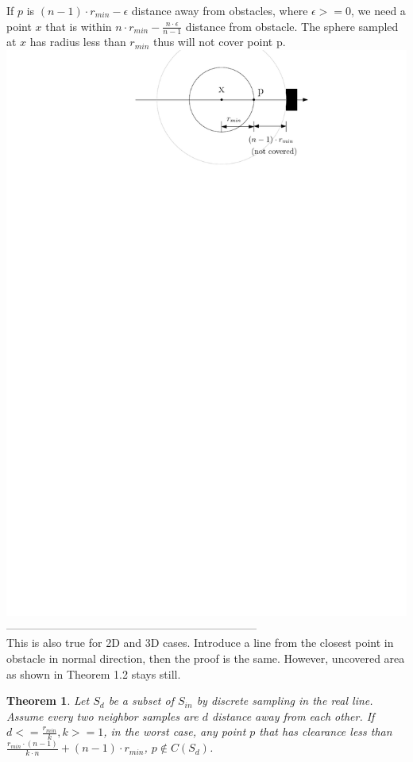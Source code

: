 \documentclass[12pt]{article}
\newtheorem{theorem}{Theorem}[section]
\begin{document}
  If $p$ is $(n-1) \cdot r_{min} - \epsilon$ distance away from obstacles, where $\epsilon >= 0$, we need a point $x$ that is within $n \cdot r_{min} - \frac{n \cdot \epsilon}{n-1}$ distance from obstacle.  The sphere sampled at $x$ has radius less than $r_{min}$ thus will not cover point p.\\
 
  \includegraphics[scale=0.8]{sample_1_3} \\
  
  --------------------------------------------------------------------\\
  
  This is also true for 2D and 3D cases. Introduce a line from the closest point in obstacle in normal direction, then the proof is the same. However, uncovered area as shown in Theorem 1.2 stays still.
  
  \begin{theorem}
  Let $S_{d}$ be a subset of $S_{in}$ by discrete sampling in the real line. Assume every two neighbor samples are $d$ distance away from each other. If $d <= \frac{r_{min}}{k}, k>=1$, in the worst case, any point $p$ that has clearance less than $\frac{r_{min} \cdot (n-1)}{k \cdot n} + (n-1) \cdot r_{min}$, $p \notin C(S_d)$.
  \end{theorem}
  
\end{document}
